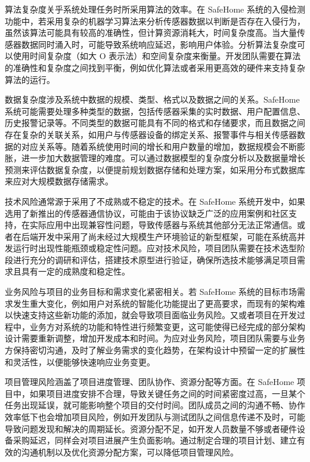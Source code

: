 
算法复杂度关乎系统处理任务时所采用算法的效率。在 SafeHome 系统的入侵检测功能中，若采用复杂的机器学习算法来分析传感器数据以判断是否存在入侵行为，虽然该算法可能具有较高的准确性，但计算资源消耗大，时间复杂度高。当大量传感器数据同时涌入时，可能导致系统响应延迟，影响用户体验。分析算法复杂度可以使用时间复杂度（如大 O 表示法）和空间复杂度来衡量。开发团队需要在算法的准确性和复杂度之间找到平衡，例如优化算法或者采用更高效的硬件来支持复杂算法的运行。


数据复杂度涉及系统中数据的规模、类型、格式以及数据之间的关系。SafeHome 系统可能需要处理多种类型的数据，包括传感器采集的实时数据、用户配置信息、历史报警记录等。不同类型的数据可能具有不同的格式和存储要求，而且数据之间存在复杂的关联关系，如用户与传感器设备的绑定关系、报警事件与相关传感器数据的对应关系等。随着系统使用时间的增长和用户数量的增加，数据规模会不断膨胀，进一步加大数据管理的难度。可以通过数据模型的复杂度分析以及数据量增长预测来评估数据复杂度，以便提前规划数据存储和处理方案，如采用分布式数据库来应对大规模数据存储需求。



技术风险通常源于采用了不成熟或不稳定的技术。在 SafeHome 系统开发中，如果选用了新推出的传感器通信协议，可能由于该协议缺乏广泛的应用案例和社区支持，在实际应用中出现兼容性问题，导致传感器与系统其他部分无法正常通信。或者在后端开发中采用了尚未经过大规模生产环境验证的新型框架，可能在系统高并发运行时出现性能瓶颈或稳定性问题。应对技术风险，项目团队需要在技术选型阶段进行充分的调研和评估，搭建技术原型进行验证，确保所选技术能够满足项目需求且具有一定的成熟度和稳定性。


业务风险与项目的业务目标和需求变化紧密相关。若 SafeHome 系统的目标市场需求发生重大变化，例如用户对系统的智能化功能提出了更高要求，而现有的架构难以快速支持这些新功能的添加，就会导致项目面临业务风险。又或者项目在开发过程中，业务方对系统的功能和特性进行频繁变更，这可能使得已经完成的部分架构设计需要重新调整，增加开发成本和时间。为应对业务风险，项目团队需要与业务方保持密切沟通，及时了解业务需求的变化趋势，在架构设计中预留一定的扩展性和灵活性，以便能够快速响应业务变更。


项目管理风险涵盖了项目进度管理、团队协作、资源分配等方面。在 SafeHome 项目中，如果项目进度安排不合理，导致关键任务之间的时间紧密度过高，一旦某个任务出现延误，就可能影响整个项目的交付时间。团队成员之间的沟通不畅、协作效率低下也会增加项目风险，例如开发团队与测试团队之间信息传递不及时，可能导致问题发现和解决的周期延长。资源分配不足，如开发人员数量不够或者硬件设备采购延迟，同样会对项目进展产生负面影响。通过制定合理的项目计划、建立有效的沟通机制以及优化资源分配方案，可以降低项目管理风险。

